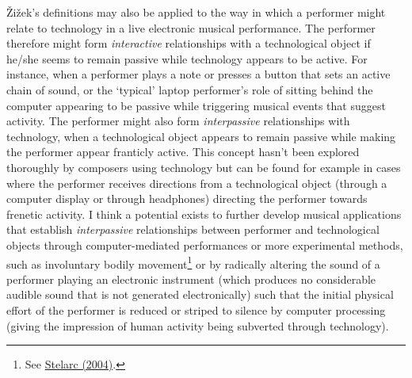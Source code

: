 \v{Z}i\v{z}ek's definitions may also be applied to the way in which a performer might relate to technology in a live electronic musical performance. The performer therefore might form \emph{interactive} relationships with a technological object if he/she seems to remain passive while technology appears to be active. For instance, when a performer plays a note or presses a button that sets an active chain of sound, or the `typical' laptop performer's role of sitting behind the computer appearing to be passive while triggering musical events that suggest activity. The performer might also form \emph{interpassive} relationships with technology, when a technological object appears to remain passive while making the performer appear franticly active. This concept hasn't been explored thoroughly by composers using technology but can be found for example in cases where the performer receives directions from a technological object (through a computer display or through headphones) directing the performer towards frenetic activity. I think a potential exists to further develop musical applications that establish \emph{interpassive} relationships between performer and technological objects through computer-mediated performances or more experimental methods, such as involuntary bodily movement\footnote{See \hyperlink{stelarc}{Stelarc (2004)}.} or by radically altering the sound of a performer playing an electronic instrument (which produces no considerable audible sound that is not generated electronically) such that the initial physical effort of the performer is reduced or striped to silence by computer processing (giving the impression of human activity being subverted through technology). 

